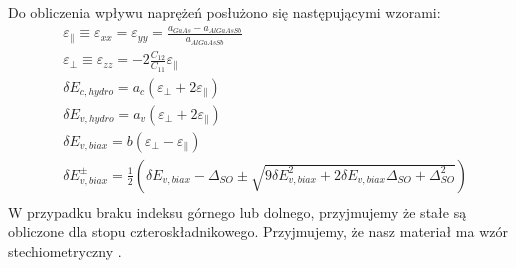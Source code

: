 \documentclass[12pt,openany,a4paper]{book}
\begin{document}
  
Do obliczenia wpływu naprężeń posłużono się następującymi wzorami:
\begin{align}
	\label{eq:strains}
	&\varepsilon_{\parallel } \equiv \varepsilon_{xx} = \varepsilon_{yy} = \frac{a_{GaAs} - a_{AlGaAsSb}}{a_{AlGaAsSb}}\\ \nonumber
	&\varepsilon_{\perp } \equiv \varepsilon_{zz} = -2\frac{C_{12}}{C_{11}}\varepsilon_{\parallel}\\ \nonumber
	&\delta E_{c,hydro} = a_c\left(\varepsilon_{\perp} + 2\varepsilon_{\parallel}\right)\\ \nonumber
	&\delta E_{v,hydro} = a_v\left(\varepsilon_{\perp} + 2\varepsilon_{\parallel}\right)\\ \nonumber
	&\delta E_{v,biax} = b\left(\varepsilon_{\perp} - \varepsilon_{\parallel}\right)\\ \nonumber
	&\delta E_{v,biax}^{\pm} = \frac{1}{2}\left(\delta E_{v,biax} - \Delta_{SO} \pm \sqrt{9\delta E_{v,biax}^2 + 2\delta E_{v,biax} \Delta_{SO} + \Delta_{SO}^2 }\right)\\ \nonumber
\end{align}
W przypadku braku indeksu górnego lub dolnego, przyjmujemy że stałe są obliczone
dla stopu czteroskładnikowego. Przyjmujemy, że nasz materiał ma wzór stechiometryczny
.
\end{document}
